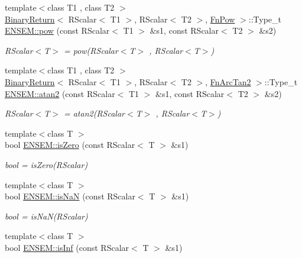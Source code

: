 \begin{DoxyCompactItemize}
\item 
{\footnotesize template$<$class T1 , class T2 $>$ }\\\mbox{\hyperlink{structBinaryReturn}{Binary\+Return}}$<$ R\+Scalar$<$ T1 $>$, R\+Scalar$<$ T2 $>$, \mbox{\hyperlink{structFnPow}{Fn\+Pow}} $>$\+::Type\+\_\+t \mbox{\hyperlink{group__rscalar_gae9777be3e406f64a9a70f5a97526102a}{E\+N\+S\+E\+M\+::pow}} (const R\+Scalar$<$ T1 $>$ \&s1, const R\+Scalar$<$ T2 $>$ \&s2)
\begin{DoxyCompactList}\small\item\em R\+Scalar$<$\+T$>$ = pow(\+R\+Scalar$<$\+T$>$ , R\+Scalar$<$\+T$>$) \end{DoxyCompactList}\item 
{\footnotesize template$<$class T1 , class T2 $>$ }\\\mbox{\hyperlink{structBinaryReturn}{Binary\+Return}}$<$ R\+Scalar$<$ T1 $>$, R\+Scalar$<$ T2 $>$, \mbox{\hyperlink{structFnArcTan2}{Fn\+Arc\+Tan2}} $>$\+::Type\+\_\+t \mbox{\hyperlink{group__rscalar_ga855c0e6f402b471f9ddfc04245e0b910}{E\+N\+S\+E\+M\+::atan2}} (const R\+Scalar$<$ T1 $>$ \&s1, const R\+Scalar$<$ T2 $>$ \&s2)
\begin{DoxyCompactList}\small\item\em R\+Scalar$<$\+T$>$ = atan2(\+R\+Scalar$<$\+T$>$ , R\+Scalar$<$\+T$>$) \end{DoxyCompactList}\item 
{\footnotesize template$<$class T $>$ }\\bool \mbox{\hyperlink{group__rscalar_gad963fef363cb9cc2ca365a068821a5ff}{E\+N\+S\+E\+M\+::is\+Zero}} (const R\+Scalar$<$ T $>$ \&s1)
\begin{DoxyCompactList}\small\item\em bool = is\+Zero(\+R\+Scalar) \end{DoxyCompactList}\item 
{\footnotesize template$<$class T $>$ }\\bool \mbox{\hyperlink{group__rscalar_ga831d3981e39b262a19f78641d8b770c3}{E\+N\+S\+E\+M\+::is\+NaN}} (const R\+Scalar$<$ T $>$ \&s1)
\begin{DoxyCompactList}\small\item\em bool = is\+Na\+N(\+R\+Scalar) \end{DoxyCompactList}\item 
{\footnotesize template$<$class T $>$ }\\bool \mbox{\hyperlink{group__rscalar_ga01c23e87027a8c43440f812a0693b62f}{E\+N\+S\+E\+M\+::is\+Inf}} (const R\+Scalar$<$ T $>$ \&s1)

\end{DoxyCompactItemize}

